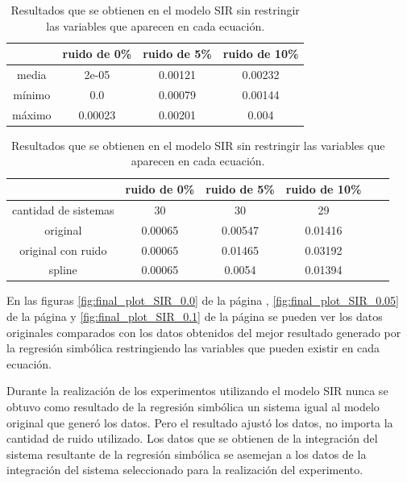 \begin{table}[!h]
    \centering
    \caption{Resultados que se obtienen en el modelo SIR sin restringir las variables que aparecen en cada ecuación.}
    \begin{tabular}{|c|c|c|c|}
        \hline
               & \textbf{ruido de 0\%} & \textbf{ruido de 5\%} & \textbf{ruido de 10\%} \\
        \hline
        media  & 2e-05                 & 0.00121               & 0.00232                \\
        \hline
        mínimo & 0.0                   & 0.00079               & 0.00144                \\
        \hline
        máximo & 0.00023               & 0.00201               & 0.004                  \\
        \hline
    \end{tabular}

    \begin{tabular}{|c|c|c|c|c|c|}
        \hline
                             & \textbf{ruido de 0\%} & \textbf{ruido de 5\%} & \textbf{ruido de 10\%} \\
        \hline
        cantidad de sistemas & 30                    & 30                    & 29                     \\
        \hline
        original             & 0.00065               & 0.00547               & 0.01416                \\
        \hline
        original con ruido   & 0.00065               & 0.01465               & 0.03192                \\
        \hline
        spline               & 0.00065               & 0.0054                & 0.01394                \\
        \hline
    \end{tabular}
    \label{table:experiment_SIR_all}
\end{table}

En las figuras \ref{fig:final_plot_SIR_0.0} de la página \pageref{fig:final_plot_SIR_0.0}, \ref{fig:final_plot_SIR_0.05} de la página \pageref{fig:final_plot_SIR_0.05} y \ref{fig:final_plot_SIR_0.1} de la página \pageref{fig:final_plot_SIR_0.1} se pueden ver los datos originales comparados con los datos obtenidos del mejor resultado generado por la regresión simbólica restringiendo las variables que pueden existir en cada ecuación.

Durante la realización de los experimentos utilizando el modelo SIR nunca se obtuvo como resultado de la regresión simbólica un sistema igual al modelo original que generó los datos. Pero el resultado ajustó los datos, no importa la cantidad de ruido utilizado. Los datos que se obtienen de la integración del sistema resultante de la regresión simbólica se asemejan a los datos de la integración del sistema seleccionado para la realización del experimento.

